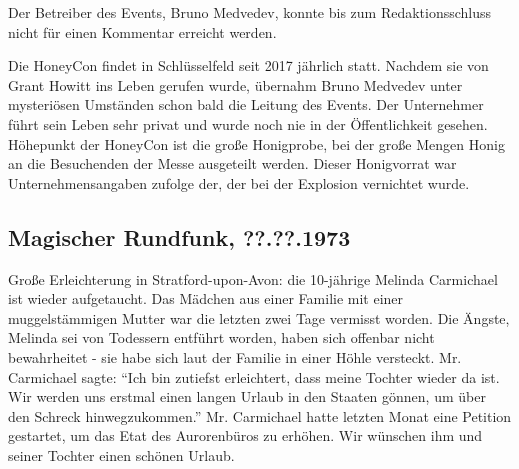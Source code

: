 \documentclass[final]{multiversum}
\begin{document}
Der Betreiber des Events, Bruno Medvedev, konnte bis zum Redaktionsschluss nicht für einen Kommentar erreicht werden.

Die HoneyCon findet in Schlüsselfeld seit 2017 jährlich statt. 
Nachdem sie von Grant Howitt ins Leben gerufen wurde, übernahm Bruno Medvedev unter mysteriösen Umständen schon bald die Leitung des Events. 
Der Unternehmer führt sein Leben sehr privat und wurde noch nie in der Öffentlichkeit gesehen. 
Höhepunkt der HoneyCon ist die große Honigprobe, bei der große Mengen Honig an die Besuchenden der Messe ausgeteilt werden. 
Dieser Honigvorrat war Unternehmensangaben zufolge der, der bei der Explosion vernichtet wurde.

\subsection{Magischer Rundfunk, ??.??.1973}
Große Erleichterung in Stratford-upon-Avon: die 10-jährige Melinda Carmichael ist wieder aufgetaucht. 
Das Mädchen aus einer Familie mit einer muggelstämmigen Mutter war die letzten zwei Tage vermisst worden. 
Die Ängste, Melinda sei von Todessern entführt worden, haben sich offenbar nicht bewahrheitet - sie habe sich laut der Familie in einer Höhle versteckt. 
Mr. Carmichael sagte: \enquote{Ich bin zutiefst erleichtert, dass meine Tochter wieder da ist. 
Wir werden uns erstmal einen langen Urlaub in den Staaten gönnen, um über den Schreck hinwegzukommen.}
Mr. Carmichael hatte letzten Monat eine Petition gestartet, um das Etat des Aurorenbüros zu erhöhen. 
Wir wünschen ihm und seiner Tochter einen schönen Urlaub. 
\end{document}

